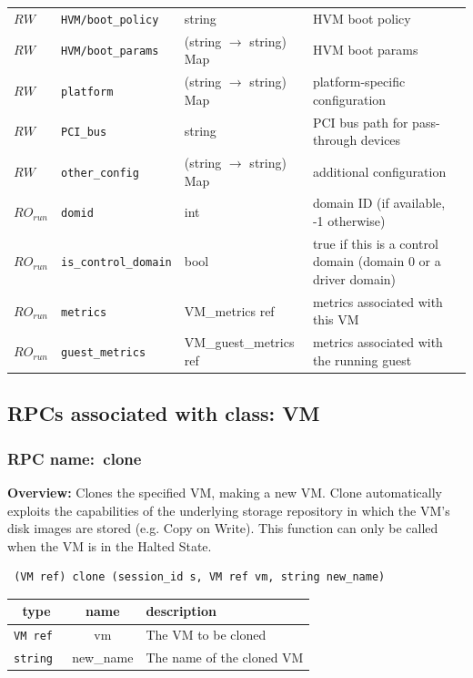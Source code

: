 \begin{longtable}{|lllp{}|}
$\mathit{RW}$ &  {\tt HVM/boot\_policy} & string & HVM boot policy \\
$\mathit{RW}$ &  {\tt HVM/boot\_params} & (string $\rightarrow$ string) Map & HVM boot params \\
$\mathit{RW}$ &  {\tt platform} & (string $\rightarrow$ string) Map & platform-specific configuration \\
$\mathit{RW}$ &  {\tt PCI\_bus} & string & PCI bus path for pass-through devices \\
$\mathit{RW}$ &  {\tt other\_config} & (string $\rightarrow$ string) Map & additional configuration \\
$\mathit{RO}_\mathit{run}$ &  {\tt domid} & int & domain ID (if available, -1 otherwise) \\
$\mathit{RO}_\mathit{run}$ &  {\tt is\_control\_domain} & bool & true if this is a control domain (domain 0 or a driver domain) \\
$\mathit{RO}_\mathit{run}$ &  {\tt metrics} & VM\_metrics ref & metrics associated with this VM \\
$\mathit{RO}_\mathit{run}$ &  {\tt guest\_metrics} & VM\_guest\_metrics ref & metrics associated with the running guest \\
\hline
\end{longtable}
\subsection{RPCs associated with class: VM}
\subsubsection{RPC name:~clone}

{\bf Overview:} 
Clones the specified VM, making a new VM. Clone automatically exploits the
capabilities of the underlying storage repository in which the VM's disk
images are stored (e.g. Copy on Write).   This function can only be called
when the VM is in the Halted State.

\begin{verbatim} (VM ref) clone (session_id s, VM ref vm, string new_name)\end{verbatim}



 
\vspace{0.3cm}
\begin{tabular}{|c|c|p{7cm}|}
 \hline
{\bf type} & {\bf name} & {\bf description} \\ \hline
{\tt VM ref } & vm & The VM to be cloned \\ \hline 

{\tt string } & new\_name & The name of the cloned VM \\ \hline 

\end{tabular}


